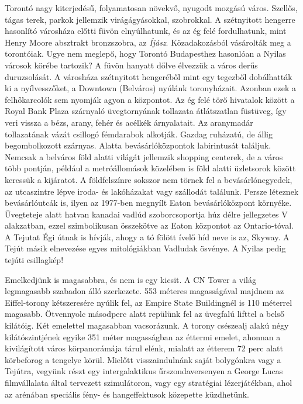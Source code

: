 Torontó nagy kiterjedésű, folyamatosan növekvő, nyugodt mozgású
város. Szellős, tágas terek, parkok jellemzik virágágyásokkal,
szobrokkal. A szétnyitott hengerre hasonlító városháza előtti füvön
elnyúlhatunk, és az ég felé fordulhatunk, mint Henry Moore absztrakt
bronzszobra, az \textit{Íjász}. Közadakozásból vásárolták meg a torontóiak.
Ugye nem meglepő, hogy Torontó Budapesthez hasonlóan a Nyilas
városok körébe tartozik? A füvön hanyatt dőlve élvezzük a város derűs
duruzsolását. A városháza szétnyitott hengeréből mint egy tegezből
dobálhatták ki a nyílvesszőket, a Downtown (Belváros) nyúlánk
toronyházait. Azonban ezek a felhőkarcolók sem nyomják agyon a központot.
Az ég felé törő hivatalok között a Royal Bank Plaza szárnyaló
üvegtornyának tollazata átlátszatlan füstüveg, így veri vissza a bézs,
arany, fehér és acélkék árnyalatait. Az aranymadár tollazatának
vázát csillogó fémdarabok alkotják. Gazdag ruházatú, de állig
begombolkozott szárnyas. Alatta bevásárlóközpontok labirintusát találjuk.
Nemcsak a belváros föld alatti világát jellemzik shopping centerek, de
a város több pontján, például a metróállomások közelében is föld alatti
üzletsorok között keressük a kijáratot. A földfelszínre sokszor nem
törnek fel a bevásárlónegyedek, az utcaszintre lépve iroda- és lakóházakat
vagy szállodát találunk. Persze léteznek bevásárlóutcák is,
ilyen az 1977-ben megnyílt Eaton bevásárlóközpont környéke. Üvegteteje
alatt hatvan kanadai vadlúd szoborcsoportja húz délre jellegzetes
V alakzatban, ezzel szimbolikusan összekötve az Eaton központot
az Ontario-tóval. A Tejutat Égi útnak is hívják, ahogy a tó fölött ívelő
híd neve is az, Skyway. A Tejút másik elnevezése egyes mitológiákban
Vadludak ösvénye. A Nyilas pedig tejúti csillagkép!

Emelkedjünk is magasabbra, és nem is egy kicsit. A CN Tower a
világ legmagasabb szabadon álló szerkezete. 553 méteres magasságával
majdnem az Eiffel-torony kétszeresére nyúlik fel, az Empire State
Buildingnél is 110 méterrel magasabb. Ötvennyolc másodperc alatt
repülünk fel az üvegfalú lifttel a belső kilátóig. Két emelettel
magasabban vacsorázunk. A torony csészealj alakú négy kilátószintjének
egyike 351 méter magasságban az éttermi emelet, ahonnan a kivilágított
város körpanorámája tárul elénk, mialatt az étterem 72 perc alatt
körbeforog a tengelye körül. Mielőtt visszaindulnánk saját bolygónkra
vagy a Tejútra, vegyünk részt egy intergalaktikus űrszondaversenyen a
George Lucas filmvállalata által tervezett szimulátoron, vagy egy
stratégiai lézerjátékban, ahol az arénában speciális fény- és
hangeffektusok közepette küzdhetünk.

